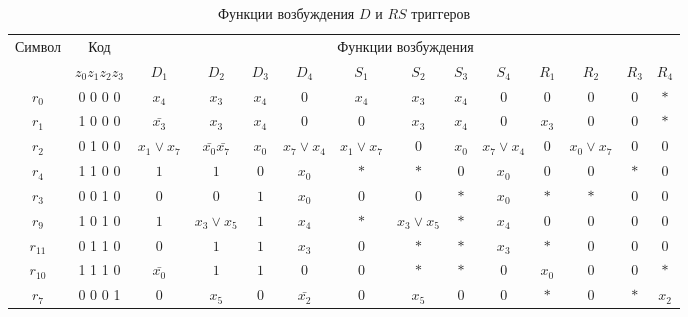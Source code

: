 \documentclass[a4paper,14pt,russian]{extarticle} %
\begin{document}
\begin{sidewaystable}			
	\centering		
	\caption{Функции возбуждения \(D\) и \(RS\) триггеров}	
	\renewcommand{\arraystretch}{0.8}
	\renewcommand{\tabcolsep}{0.34em}	
	\label{tab:triggersD_RS} 
	\begin{tabular}{|c|c|c|c|c|c||c|c|c|c||c|c|c|c|}												
		\hline														
		Символ	& Код	& \multicolumn{12}{c|}{Функции возбуждения}	\\ \cline{2-14}											
		&\({z_0}{z_1}{z_2}{z_3}\)	 &\({D_1}\)	 &\({D_2}\)	 &\({D_3}\)	 &\({D_4}\)	 &\({S_1}\)	 &\({S_2}\)	 &\({S_3}\)	 &\({S_4}\)	 &\({R_1}\)	 &\({R_2}\)	 &\({R_3}\)	 &\({R_4}\)	\\ \hline
		\({r_{0}}\) & 	0 0 0 0 	 & \({x_{4}}\)	 & \({x_{3}}\)	 & \({x_{4}}\)	 & \(0\)	 & \({x_{4}}\)	 & \({x_{3}}\)	 & \({x_{4}}\)	 & \(0\)	 & \(0\)	 & \(0\)	 & \(0\)	 & \(*\)	\\ \hline
		\({r_{1}}\) & 	1 0 0 0 	 & \(\bar{x_{3}}\)	 & \({x_{3}}\)	 & \({x_{4}}\)	 & \(0\)	 & \(0\)	 & \({x_{3}}\)	 & \({x_{4}}\)	 & \(0\)	 & \({x_{3}}\)	 & \(0\)	 & \(0\)	 & \(*\)	\\ \hline
		\({r_{2}}\) & 	0 1 0 0 	 & \({x_{1}}\vee{x_{7}}\)	 & \(\bar{x_{0}}\bar{x_{7}}\)	 & \({x_{0}}\)	 & \({x_{7}}\vee{x_{4}}\)	 & \({x_{1}}\vee{x_{7}}\)	 & \(0\)	 & \({x_{0}}\)	 & \({x_{7}}\vee{x_{4}}\)	 & \(0\)	 & \({x_{0}}\vee{x_{7}}\)	 & \(0\)	 & \(0\)	\\ \hline
		\({r_{4}}\) & 	1 1 0 0 	 & \(1\)	 & \(1\)	 & \(0\)	 & \({x_{0}}\)	 & \(*\)	 & \(*\)	 & \(0\)	 & \({x_{0}}\)	 & \(0\)	 & \(0\)	 & \(*\)	 & \(0\)	\\ \hline
		\({r_{3}}\) & 	0 0 1 0 	 & \(0\)	 & \(0\)	 & \(1\)	 & \({x_{0}}\)	 & \(0\)	 & \(0\)	 & \(*\)	 & \({x_{0}}\)	 & \(*\)	 & \(*\)	 & \(0\)	 & \(0\)	\\ \hline
		\({r_{9}}\) & 	1 0 1 0 	 & \(1\)	 & \({x_{3}}\vee{x_{5}}\)	 & \(1\)	 & \({x_{4}}\)	 & \(*\)	 & \({x_{3}}\vee{x_{5}}\)	 & \(*\)	 & \({x_{4}}\)	 & \(0\)	 & \(0\)	 & \(0\)	 & \(0\)	\\ \hline
		\({r_{11}}\) & 	0 1 1 0 	 & \(0\)	 & \(1\)	 & \(1\)	 & \({x_{3}}\)	 & \(0\)	 & \(*\)	 & \(*\)	 & \({x_{3}}\)	 & \(*\)	 & \(0\)	 & \(0\)	 & \(0\)	\\ \hline
		\({r_{10}}\) & 	1 1 1 0 	 & \(\bar{x_{0}}\)	 & \(1\)	 & \(1\)	 & \(0\)	 & \(0\)	 & \(*\)	 & \(*\)	 & \(0\)	 & \({x_{0}}\)	 & \(0\)	 & \(0\)	 & \(*\)	\\ \hline
		\({r_{7}}\) & 	0 0 0 1 	 & \(0\)	 & \({x_{5}}\)	 & \(0\)	 & \(\bar{x_{2}}\)	 & \(0\)	 & \({x_{5}}\)	 & \(0\)	 & \(0\)	 & \(*\)	 & \(0\)	 & \(*\)	 & \({x_{2}}\)	\\ \hline

\end{tabular}
\end{sidewaystable}
\end{document}

